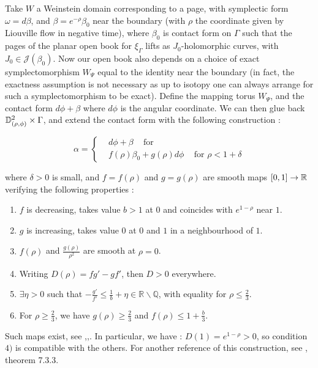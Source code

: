 \documentclass[../main.tex]{subfiles}
\begin{document}
Take $W$ a Weinstein domain corresponding to a page, with symplectic form $\omega = d\beta$, and $\beta = e^{-\rho}\beta_0$ near the boundary (with $\rho$ the coordinate given by Liouville flow in negative time), where $\beta_0$ is contact form on $\Gamma$ such that the pages of the planar open book for $\xi_\Gamma$ lifts as $J_0$-holomorphic curves, with $J_0\in\mathcal{J}(\beta_0)$. Now our open book also depends on a choice of exact symplectomorphism $W_\Psi$ equal to the identity near the boundary (in fact, the exactness assumption is not necessary as up to isotopy one can always arrange for such a symplectomorphism to be exact). Define the mapping torus $W_\Psi$, and the contact form $d\phi +\beta$ where $d\phi$ is the angular coordinate. We can then glue back $\mathbb{D}^2_{(\rho,\phi)}\times \Gamma$, and extend the contact form with the following construction :


$$\alpha = \left\{ \begin{array}{lll}
& d\phi + \beta \;\;\;\mbox{ for }  \\
& f(\rho) \beta_0 + g(\rho) d\phi \;\;\;\mbox{ for } \rho < 1+ \delta 
\end{array}
\right.$$

where $\delta>0$ is small, and $f = f(\rho)$ and $g = g(\rho)$ are smooth maps $[0,1]\rightarrow \mathbb{R}$ verifying the following properties : 
\begin{enumerate}
    \item $f$ is decreasing, takes value $b > 1$ at $0$ and coincides with $e^{1-\rho}$ near $1$.
    \item $g$ is increasing, takes value $0$ at $0$ and $1$ in a neighbourhood of $1$.
    \item $f(\rho)$ and $\frac{g(\rho)}{\rho^2}$ are smooth at $\rho = 0$. 
    \item Writing $D(\rho) = fg' - gf'$, then $D > 0$ everywhere.
    \item $\exists \eta>0$ such that $-\frac{g'}{f'}\leq \frac{1}{b} + \eta\in \mathbb{R}\backslash\mathbb{Q}$, with equality for $\rho\leq \frac{2}{3}$.
    \item For $\rho \geq \frac{2}{3}$, we have $g(\rho) \geq \frac{2}{3}$ and $f(\rho)\leq 1+\frac{b}{3}$. 
\end{enumerate}

Such maps exist, see \cite{roux_cas_nodate},\cite{wendl_open_2009},\cite{wendl_holomorphic_2010}. In particular, we have : $D(1) = e^{1-\rho}> 0$, so condition $4)$ is compatible with the others. For another reference of this construction, see \cite{geiges_introduction_nodate}, theorem 7.3.3.\\
\end{document}
